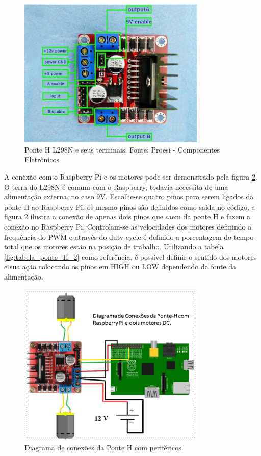 \begin{figure}[H]
    \centering
    \includegraphics[width=0.8\textwidth]{figuras/ponteH.eps}
    \caption{Ponte H L298N e seus terminais. Fonte: Proesi - Componentes Eletrônicos}
    \label{fig:ponteH}
\end{figure}

A conexão com o Raspberry Pi e os motores pode ser demonstrado pela figura \ref{fig:esquematico_componentes}. O terra do L298N é comum com o
Raspberry, todavia necessita de uma alimentação externa, no caso 9V. Escolhe-se quatro pinos para serem ligados da ponte H ao Raspberry Pi,
os mesmo pinos são definidos como saída no código, a figura \ref{fig:esquematico_componentes} ilustra a conexão de apenas dois pinos que saem
da ponte H e fazem a conexão no Raspberry Pi. Controlam-se as velocidades dos motores definindo a frequência do PWM e através do duty cycle
é definido a porcentagem do tempo total que os motores estão na posição de trabalho. Utilizando a tabela \ref{fig:tabela_ponte_H_2} como
referência, é possível definir o sentido dos motores e sua ação colocando os pinos em HIGH ou LOW  dependendo da fonte da alimentação. 

\begin{figure}[H]
    \centering
    \includegraphics[width=0.8\textwidth]{figuras/esquematico_componentes.eps}
    \caption{Diagrama de conexões da Ponte H com periféricos.}
    \label{fig:esquematico_componentes}
\end{figure}

